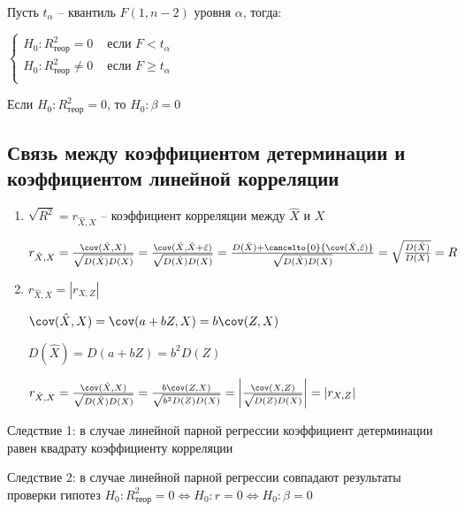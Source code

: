 Пусть $t_\alpha$ -- квантиль $F(1, n - 2)$ уровня $\alpha$, тогда:

$\begin{cases}
    H_0 : R^2_{\text{теор}} = 0 & \text{ если } F < t_\alpha \\
    H_0 : R^2_{\text{теор}} \neq 0 & \text{ если } F \geq t_\alpha \\
\end{cases}$

\Nota Если $H_0 : R^2_{\text{теор}} = 0$, то $H_0 : \beta = 0$

\hypertarget{correlation_coefficient_connection}{}

\subsection{Связь между коэффициентом детерминации и коэффициентом линейной корреляции}

\begin{enumerate}
    \item $\sqrt{R^2} = r_{\hat X, X}$ -- коэффициент корреляции между $\hat X$ и $X$
    \begin{MyProof}
        $r_{\hat X, X} = \frac{\cov (\hat X, X)}{\sqrt{D(\hat X) D(X)}} = \frac{\cov (\hat X, \hat X + \hat \varepsilon)}{\sqrt{D(\hat X) D(X)}} = 
        \frac{D(\hat X) + \cancelto{0}{\cov (\hat X, \hat \varepsilon)}}{\sqrt{D(\hat X) D(X)}} = \sqrt{\frac{D(\hat X)}{D(X)}} = R$
    \end{MyProof}

    \item $r_{\hat X, X} = |r_{X, Z}|$

    \begin{MyProof}
        $\cov (\hat X, X) = \cov (a + bZ, X) = b \cov (Z, X)$

        $D(\hat X) = D(a + b Z) = b^2 D(Z)$

        $r_{\hat X, X} = \frac{\cov (\hat X, X)}{\sqrt{D(\hat X) D(X)}} = \frac{b \cov (Z, X)}{\sqrt{b^2 D(Z) D(X)}} = \left|\frac{\cov (X, Z)}{\sqrt{D(Z) D(X)}}\right| = |r_{X, Z}|$
    \end{MyProof}
\end{enumerate}

Следствие 1: в случае линейной парной регрессии коэффициент детерминации равен квадрату коэффициенту корреляции

Следствие 2: в случае линейной парной регрессии совпадают результаты проверки гипотез 
$H_0 : R^2_{\text{теор}} = 0 \Longleftrightarrow H_0 : r = 0 \Longleftrightarrow H_0 : \beta = 0$

